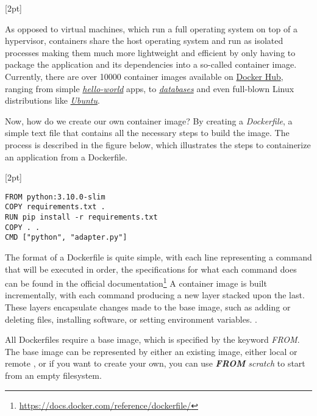 [2pt]

As opposed to virtual machines, which run a full operating system on top of a hypervisor, containers share the host operating system and run as isolated processes
making them much more lightweight and efficient by only having to package the application and its dependencies into a so-called container image.
Currently, there are over 10000 container images available on \href{https://hub.docker.com/}{Docker Hub}, ranging from simple \href{https://hub.docker.com/_/hello-world}{\textit{hello-world}} apps, to 
\href{https://hub.docker.com/search?categories=Databases+\%26+Storage}{\textit{databases}} and even full-blown Linux distributions like \href{https://hub.docker.com/_/ubuntu}{\textit{Ubuntu}}.

Now, how do we create our own container image? By creating a \textit{Dockerfile}, a simple text file that contains all the necessary steps to build the image.
The process is described in the figure below, which illustrates the steps to containerize an application from a Dockerfile.

[2pt]

\lstset{language=Dockerfile,caption=Sample Dockerfile,label=lst:ex-dockerfile}
\begin{lstlisting}
FROM python:3.10.0-slim
COPY requirements.txt .
RUN pip install -r requirements.txt
COPY . .
CMD ["python", "adapter.py"]    
\end{lstlisting}

The format of a Dockerfile is quite simple, with each line representing a command that will be executed in order, the specifications for what each command does can be found in the official documentation\footnote[1]{\href{https://docs.docker.com/reference/dockerfile/}{https://docs.docker.com/reference/dockerfile/}}
A container image is built incrementally, with each command producing a new layer stacked upon the last. These layers encapsulate changes made to the base image, such as adding or deleting files, installing software, or setting environment variables. \cite{image-layers}.


All Dockerfiles require a base image, which is specified by the keyword \textit{FROM}.
The base image can be represented by either an existing image, either local or remote , or if you want to create your own, you can use \textit{\textbf{FROM} scratch} to start from an empty filesystem.

